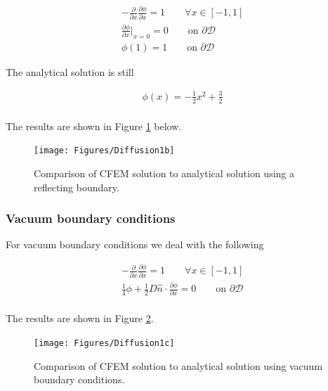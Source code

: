 \documentclass[11pt,letterpaper,titlepage]{article}
\newcommand{\bOmega}{\mathcal{D}}
\numberwithin{equation}{section}
\begin{document}
\begin{equation*}
\begin{aligned}
-\frac{\partial}{\partial x} \frac{\partial \phi}{\partial x} = 1 \quad \quad \forall x \in [-1,1] \\
\frac{\partial \phi}{\partial x}\biggr |_{x=0} = 0 \quad \quad \text{on } \partial \bOmega \\
\phi(1) = 1 \quad \quad \text{on } \partial \bOmega
\end{aligned}
\end{equation*}

The analytical solution is still

\begin{equation*}
\begin{aligned}
\phi(x) = -\frac{1}{2}x^2 + \frac{3}{2} \\
\end{aligned}
\end{equation*}

The results are shown in Figure \ref{fig:Diffusion1b} below.

\begin{figure}[H]
\centering
\texttt{[image: Figures/Diffusion1b]}
\caption{Comparison of CFEM solution to analytical solution using a reflecting boundary.}
\label{fig:Diffusion1b}
\end{figure}

\subsubsection{Vacuum boundary conditions}
For vacuum boundary conditions we deal with the following

\begin{equation*}
\begin{aligned}
-\frac{\partial}{\partial x} \frac{\partial \phi}{\partial x} = 1 \quad \quad \forall x \in [-1,1] \\
\frac{1}{4}\phi + \frac{1}{2}D \hat{n} \cdot \frac{\partial \phi}{\partial x} = 0 \quad \quad \text{on } \partial \bOmega \\
\end{aligned}
\end{equation*}

The results are shown in Figure \ref{fig:Diffusion1c}.

\begin{figure}[H]
\centering
\texttt{[image: Figures/Diffusion1c]}
\caption{Comparison of CFEM solution to analytical solution using vacuum boundary conditions.}
\label{fig:Diffusion1c}
\end{figure}
\end{document}
